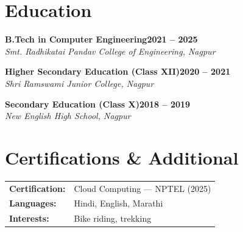 \documentclass[10.5pt,a4paper]{article}
\newcommand{\eduentry}[3]{%
  \textbf{#1}\hfill \textbf{#2}\\
  \textit{#3}\par
}
\begin{document}
\section{Education}
\eduentry{B.Tech in Computer Engineering}{2021 -- 2025}{Smt. Radhikatai Pandav College of Engineering, Nagpur}
\edusp
\eduentry{Higher Secondary Education (Class XII)}{2020 -- 2021}{Shri Ramswami Junior College, Nagpur}
\edusp
\eduentry{Secondary Education (Class X)}{2018 -- 2019}{New English High School, Nagpur}

\vspace{-3pt}
\section{Certifications \& Additional}
\vspace{-2pt}
\begin{tabularx}{\textwidth}{@{}l X@{}}
\textbf{Certification:} & Cloud Computing --- NPTEL (2025) \\[2pt]
\textbf{Languages:}     & Hindi, English, Marathi \\[2pt]
\textbf{Interests:}     & Bike riding, trekking \\
\end{tabularx}
\end{document}
